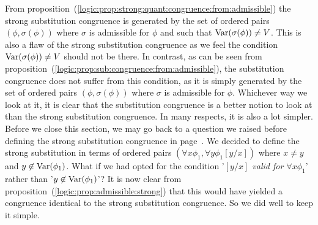 From
proposition~(\ref{logic:prop:strong:quant:congruence:from:admissible})
the strong substitution congruence is generated by the set of
ordered pairs $(\phi,\sigma(\phi))$ where $\sigma$ is admissible for
$\phi$ and such that $\mbox{\rm Var}(\sigma(\phi))\neq V$. This is also a flaw
of the strong substitution congruence as we feel the condition
$\mbox{\rm Var}(\sigma(\phi))\neq V$ should not be there. In contrast, as can
be seen from
proposition~(\ref{logic:prop:sub:congruence:from:admissible}), the
substitution congruence does not suffer from this condition, as it
is simply generated by the set of ordered pairs
$(\phi,\sigma(\phi))$ where $\sigma$ is admissible for $\phi$.
Whichever way we look at it, it is clear that the substitution
congruence is a better notion to look at than the strong
substitution congruence. In many respects, it is also a lot simpler.
Before we close this section, we may go back to a question we raised
before defining the strong substitution congruence in
page~\pageref{logic:def:strong:sub:congruence}. We decided to define
the strong substitution in terms of ordered pairs $(\forall
x\phi_{1},\forall y\phi_{1}[y/x])$ where $x\neq y$ and
$y\not\in\mbox{\rm Var}(\phi_{1})$. What if we had opted for the condition
'{\em $[y/x]$ valid for $\forall x\phi_{1}$}' rather than
'$y\not\in\mbox{\rm Var}(\phi_{1})$'? It is now clear from
proposition~(\ref{logic:prop:admissible:strong}) that this would
have yielded a congruence identical to the strong substitution
congruence. So we did well to keep it simple.
